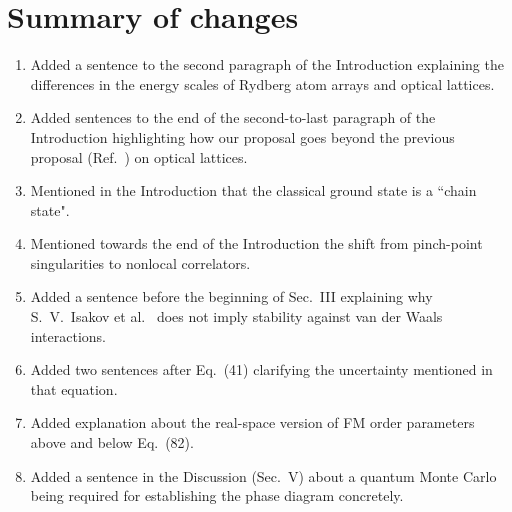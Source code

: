 \documentclass[
onecolumn,
superscriptaddress,
longbibliography,
nofootinbib,
 amsmath,amssymb,
 aps,
prb
]{revtex4-2}
\begin{document}
\noindent\makebox[\linewidth]{\rule{\textwidth}{0.4pt}}
\section{Summary of changes}

\begin{enumerate}
\item Added a sentence to the second paragraph of the Introduction explaining the differences in the energy scales of Rydberg atom arrays and optical lattices.
    \item Added sentences to the end of the second-to-last paragraph of the Introduction highlighting how our proposal goes beyond the previous proposal (Ref.~\cite{tewari2006emergence}) on optical lattices.
    \item Mentioned in the Introduction that the classical ground state is a ``chain state". 
    \item Mentioned towards the end of the Introduction the shift from pinch-point singularities to nonlocal correlators.%
    \item Added a sentence before the beginning of Sec.~III explaining why S.~V.~Isakov et  al.~\cite{isakov2005why} does not imply stability against van der Waals interactions.
    \item Added two sentences after Eq.~(41) clarifying the uncertainty mentioned in that equation.
    \item Added explanation about the real-space version of FM order parameters above and below Eq.~(82).
    \item Added a sentence in the Discussion (Sec.~V) about a quantum Monte Carlo being required for establishing the phase diagram concretely.
    
\end{enumerate}





\end{document}

